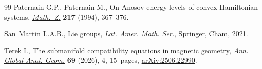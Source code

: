 \documentclass[pdftex]{sigma}
\numberwithin{equation}{section}
\theoremstyle{definition}
\begin{document}
\begin{thebibliography}{99}
Paternain G.P., Paternain M., On {A}nosov energy levels of convex {H}amiltonian
 systems, \href{https://doi.org/10.1007/BF02571949}{\textit{Math.~Z.}}
 \textbf{217} (1994), 367--376.

San~Martin L.A.B., Lie groups, \textit{Lat. Amer. Math. Ser.},
 \href{https://doi.org/10.1007/978-3-030-61824-7}{Springer}, Cham, 2021.

Terek I., The submanifold compatibility equations in magnetic geometry,
 \href{https://doi.org/10.1007/s10455-026-10026-7}{\textit{Ann. Global Anal.
 Geom.}} \textbf{69} (2026), 4, 15~pages,
 \href{http://arxiv.org/abs/2506.22990}{arXiv:2506.22990}.

\end{thebibliography}\LastPageEnding
\end{document}
